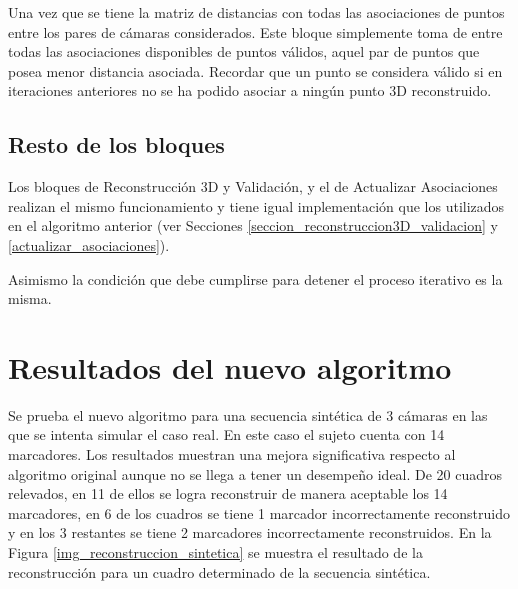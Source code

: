 Una vez que se tiene la matriz de distancias con todas las asociaciones de puntos entre los pares de cámaras considerados. Este bloque simplemente toma de entre todas las asociaciones disponibles de puntos válidos, aquel par de puntos que posea menor distancia asociada.
Recordar que un punto se considera válido si en iteraciones anteriores no se ha podido asociar a ningún punto 3D reconstruido.

\subsection{Resto de los bloques}

Los bloques de Reconstrucción 3D y Validación, y el de Actualizar Asociaciones realizan el mismo funcionamiento y tiene igual implementación que los utilizados en el algoritmo anterior (ver Secciones \ref{seccion_reconstruccion3D_validacion} y \ref{actualizar_asociaciones}).

  Asimismo la condición que debe cumplirse para detener el proceso iterativo es la misma.
  
  
\section{Resultados del nuevo algoritmo}  
 
Se prueba el nuevo algoritmo para una secuencia sintética de 3 cámaras en las que se intenta simular el caso real. En este caso el sujeto cuenta con 14 marcadores. 
Los resultados muestran una mejora significativa respecto al algoritmo original
aunque no se llega a tener un desempeño ideal. 
De 20 cuadros relevados, en 11 de ellos se logra reconstruir de manera aceptable los 14 marcadores, en 6 de los cuadros se tiene 1 marcador incorrectamente reconstruido y en los 3 restantes se tiene 2 marcadores incorrectamente reconstruidos.
En la Figura \ref{img_reconstruccion_sintetica} se muestra el resultado de la reconstrucción para un cuadro  determinado de la secuencia sintética.\\

